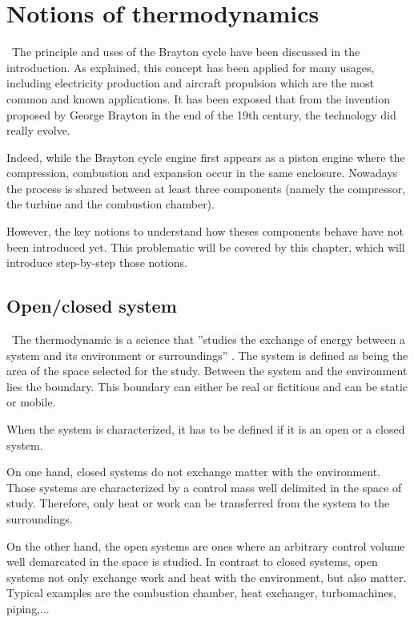 \graphicspath{{Chapitre_2/Images/}}
\chapter{Notions of thermodynamics}\label{C2}
\quad\, The principle and uses of the Brayton cycle have been discussed in the introduction. As explained, this concept has been applied for many usages, including electricity production and aircraft propulsion which are the most common and known applications. It has been exposed that from the invention proposed by George Brayton in the end of the 19th century, the technology did really evolve.

Indeed, while the Brayton cycle engine first appears as a  piston engine where the compression, combustion and expansion occur in the same enclosure. Nowadays the process is shared between at least three components (namely the compressor, the turbine and the combustion chamber).

However, the key notions to understand how theses components behave have not been introduced yet. This problematic will be covered by this chapter, which will introduce step-by-step those notions.
\section{Open/closed system}\label{sect:C2_Sys}
\quad\,  The thermodynamic is a science that ''studies the exchange of energy between a system and its environment or surroundings'' \cite{thermoApp_1}.
The system is defined as being the area of the space selected for the study. Between the system and the environment lies the boundary. This boundary can either be real or fictitious and can be static or mobile.

When the system is characterized, it has to be defined if it is an open or a closed system.

On one hand, closed systems do not exchange matter with the environment. Those systems are characterized by a control mass well delimited in the space of study. Therefore, only heat or work can be transferred from the system to the surroundings.

On the other hand, the open systems are ones where an arbitrary control volume well demarcated in the space is studied. In contrast to closed systems, open systems not only exchange work and heat with the environment, but also matter. Typical examples are the combustion chamber, heat exchanger, turbomachines, piping,...

